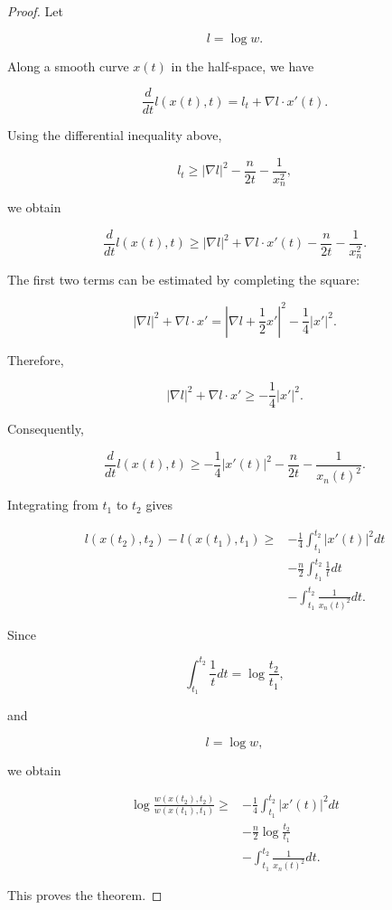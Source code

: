\documentclass[10pt,a4paper]{amsart}
\begin{document}
\begin{proof}

Let

\[
l=\log w .
\]

Along a smooth curve $x(t)$ in the half-space, we have

\[
\frac{d}{dt}l(x(t),t)
=
l_t+\nabla l\cdot x'(t).
\]

Using the differential inequality above,

\[
l_t
\geq
|\nabla l|^2
-\frac n{2t}
-\frac1{x_n^2},
\]

we obtain

\[
\frac{d}{dt}l(x(t),t)
\geq
|\nabla l|^2
+
\nabla l\cdot x'(t)
-
\frac n{2t}
-\frac1{x_n^2}.
\]

The first two terms can be estimated by completing the square:

\[
|\nabla l|^2
+
\nabla l\cdot x'
=
\left|
\nabla l+\frac12x'
\right|^2
-
\frac14|x'|^2 .
\]

Therefore,

\[
|\nabla l|^2
+
\nabla l\cdot x'
\geq
-\frac14|x'|^2 .
\]

Consequently,

\[
\frac{d}{dt}l(x(t),t)
\geq
-\frac14|x'(t)|^2
-\frac n{2t}
-\frac1{x_n(t)^2}.
\]

Integrating from $t_1$ to $t_2$ gives

\[
\begin{aligned}
l(x(t_2),t_2)-l(x(t_1),t_1)
\geq&
-\frac14
\int_{t_1}^{t_2}
|x'(t)|^2dt
\\
&
-\frac n2
\int_{t_1}^{t_2}
\frac1t dt
\\
&
-
\int_{t_1}^{t_2}
\frac1{x_n(t)^2}dt .
\end{aligned}
\]

Since

\[
\int_{t_1}^{t_2}\frac1t dt
=
\log\frac{t_2}{t_1},
\]

and

\[
l=\log w,
\]

we obtain

\[
\begin{aligned}
\log
\frac{w(x(t_2),t_2)}
     {w(x(t_1),t_1)}
\geq&
-\frac14
\int_{t_1}^{t_2}
|x'(t)|^2dt
\\
&
-\frac n2
\log\frac{t_2}{t_1}
\\
&
-
\int_{t_1}^{t_2}
\frac1{x_n(t)^2}dt .
\end{aligned}
\]

This proves the theorem.

\end{proof}
\end{document}
